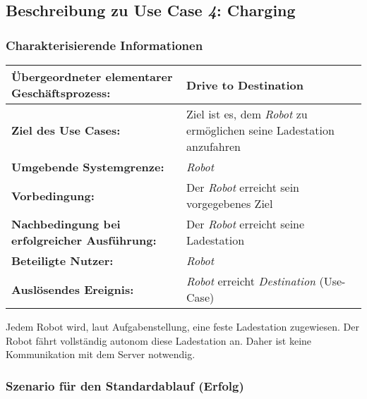 			
		\pagebreak

		\subsection{Beschreibung zu Use Case \emph{4}: Charging}

			\subsubsection*{Charakterisierende Informationen}

			\begin{table}[H]
				\centering
				\begin{tabularx}{\textwidth}{@{}p{5cm}X@{}}
				\hline
				\textbf{Übergeordneter elementarer Geschäftsprozess:} & Drive to Destination\\ \hline
				\textbf{Ziel des Use Cases:} & Ziel ist es, dem \emph{Robot} zu ermöglichen seine Ladestation anzufahren\\ \hline
				\textbf{Umgebende Systemgrenze:} & \emph{Robot}\\ \hline
				\textbf{Vorbedingung:} & Der \emph{Robot} erreicht sein vorgegebenes Ziel\\ \hline
				\textbf{Nachbedingung bei erfolgreicher Ausführung:} & Der \emph{Robot} erreicht seine Ladestation\\ \hline
				\textbf{Beteiligte Nutzer:} & \emph{Robot}\\ \hline
				\textbf{Auslösendes Ereignis:} & \emph{Robot} erreicht \emph{Destination} (Use-Case)\\
				\hline
				\end{tabularx}
			\end{table}

			Jedem Robot wird, laut Aufgabenstellung, eine feste Ladestation zugewiesen. Der Robot fährt vollständig autonom diese Ladestation an. Daher ist keine Kommunikation mit dem Server notwendig.

			\subsubsection*{Szenario für den Standardablauf (Erfolg)}

